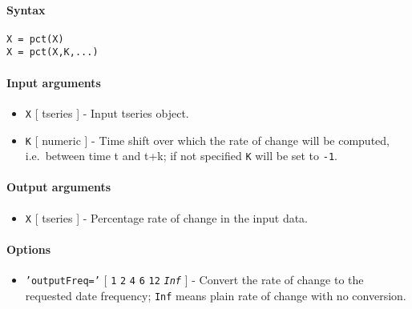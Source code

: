 


	\paragraph{Syntax}\label{syntax}

\begin{verbatim}
X = pct(X)
X = pct(X,K,...)
\end{verbatim}

\paragraph{Input arguments}\label{input-arguments}

\begin{itemize}
\item
  \texttt{X} {[} tseries {]} - Input tseries object.
\item
  \texttt{K} {[} numeric {]} - Time shift over which the rate of change
  will be computed, i.e.~between time t and t+k; if not specified
  \texttt{K} will be set to \texttt{-1}.
\end{itemize}

\paragraph{Output arguments}\label{output-arguments}

\begin{itemize}
\itemsep1pt\parskip0pt
\item
  \texttt{X} {[} tseries {]} - Percentage rate of change in the input
  data.
\end{itemize}

\paragraph{Options}\label{options}

\begin{itemize}
\itemsep1pt\parskip0pt
\item
  \texttt{'outputFreq='} {[} \texttt{1} \textbar{} \texttt{2} \textbar{}
  \texttt{4} \textbar{} \texttt{6} \textbar{} \texttt{12} \textbar{}
  \emph{\texttt{Inf}} {]} - Convert the rate of change to the requested
  date frequency; \texttt{Inf} means plain rate of change with no
  conversion.
\end{itemize}

